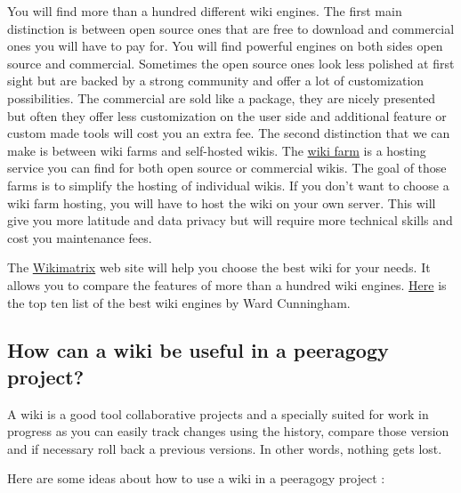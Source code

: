 You will find more than a hundred different wiki engines. The first main
distinction is between open source ones that are free to download and
commercial ones you will have to pay for. You will find powerful engines
on both sides open source and commercial. Sometimes the open source ones
look less polished at first sight but are backed by a strong community
and offer a lot of customization possibilities. The commercial are sold
like a package, they are nicely presented but often they offer less
customization on the user side and additional feature or custom made
tools will cost you an extra fee. The second distinction that we can
make is between wiki farms and self-hosted wikis. The
\href{http://en.wikipedia.org/wiki/Wiki\_hosting\_service}{wiki farm} is
a hosting service you can find for both open source or commercial wikis.
The goal of those farms is to simplify the hosting of individual wikis.
If you don't want to choose a wiki farm hosting, you will have to host
the wiki on your own server. This will give you more latitude and data
privacy but will require more technical skills and cost you maintenance
fees.

The \href{http://www.wikimatrix.org/}{Wikimatrix} web site will help you
choose the best wiki for your needs. It allows you to compare the
features of more than a hundred wiki engines.
\href{http://c2.com/cgi/wiki?TopTenWikiEngines}{Here} is the top ten
list of the best wiki engines by Ward Cunningham.

\subsection{How can a wiki be useful in a peeragogy project?}

A wiki is a good tool collaborative projects and a specially suited for
work in progress as you can easily track changes using the history,
compare those version and if necessary roll back a previous versions. In
other words, nothing gets lost.

Here are some ideas about how to use a wiki in a peeragogy project :

